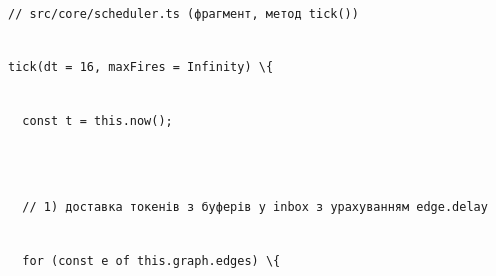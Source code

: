 \documentclass[
]{article}
\newcommand{\passthrough}[1]{#1}
\begin{document}
\passthrough{\lstinline!//!}\passthrough{\lstinline! !}\passthrough{\lstinline!src!}\passthrough{\lstinline!/!}\passthrough{\lstinline!core!}\passthrough{\lstinline!/!}\passthrough{\lstinline!scheduler!}\passthrough{\lstinline!.!}\passthrough{\lstinline!ts!}\passthrough{\lstinline! !}\passthrough{\lstinline!(фрагмент,!}\passthrough{\lstinline! !}\passthrough{\lstinline!метод!}\passthrough{\lstinline! !}\passthrough{\lstinline!tick!}\passthrough{\lstinline!())!}\strut \\
\passthrough{\lstinline!tick!}\passthrough{\lstinline!(!}\passthrough{\lstinline!dt!}\passthrough{\lstinline! !}\passthrough{\lstinline!=!}\passthrough{\lstinline! !}\passthrough{\lstinline!16,!}\passthrough{\lstinline! !}\passthrough{\lstinline!maxFires!}\passthrough{\lstinline! !}\passthrough{\lstinline!=!}\passthrough{\lstinline! !}\passthrough{\lstinline!Infinity!}\passthrough{\lstinline!)!}\passthrough{\lstinline! !}\passthrough{\lstinline!\{!}\strut \\
\passthrough{\lstinline!  !}\passthrough{\lstinline!const!}\passthrough{\lstinline! !}\passthrough{\lstinline!t!}\passthrough{\lstinline! !}\passthrough{\lstinline!=!}\passthrough{\lstinline! !}\passthrough{\lstinline!this!}\passthrough{\lstinline!.!}\passthrough{\lstinline!now!}\passthrough{\lstinline!();!}\strut \\
\strut \\
\passthrough{\lstinline!  !}\passthrough{\lstinline!//!}\passthrough{\lstinline! !}\passthrough{\lstinline!1)!}\passthrough{\lstinline! !}\passthrough{\lstinline!доставка!}\passthrough{\lstinline! !}\passthrough{\lstinline!токенів!}\passthrough{\lstinline! !}\passthrough{\lstinline!з!}\passthrough{\lstinline! !}\passthrough{\lstinline!буферів!}\passthrough{\lstinline! !}\passthrough{\lstinline!у!}\passthrough{\lstinline! !}\passthrough{\lstinline!inbox!}\passthrough{\lstinline! !}\passthrough{\lstinline!з!}\passthrough{\lstinline! !}\passthrough{\lstinline!урахуванням!}\passthrough{\lstinline! !}\passthrough{\lstinline!edge!}\passthrough{\lstinline!.!}\passthrough{\lstinline!delay!}\strut \\
\passthrough{\lstinline!  !}\passthrough{\lstinline!for!}\passthrough{\lstinline! !}\passthrough{\lstinline!(!}\passthrough{\lstinline!const!}\passthrough{\lstinline! !}\passthrough{\lstinline!e!}\passthrough{\lstinline! !}\passthrough{\lstinline!of!}\passthrough{\lstinline! !}\passthrough{\lstinline!this!}\passthrough{\lstinline!.!}\passthrough{\lstinline!graph!}\passthrough{\lstinline!.!}\passthrough{\lstinline!edges!}\passthrough{\lstinline!)!}\passthrough{\lstinline! !}\passthrough{\lstinline!\{!}\strut \\
\end{document}
